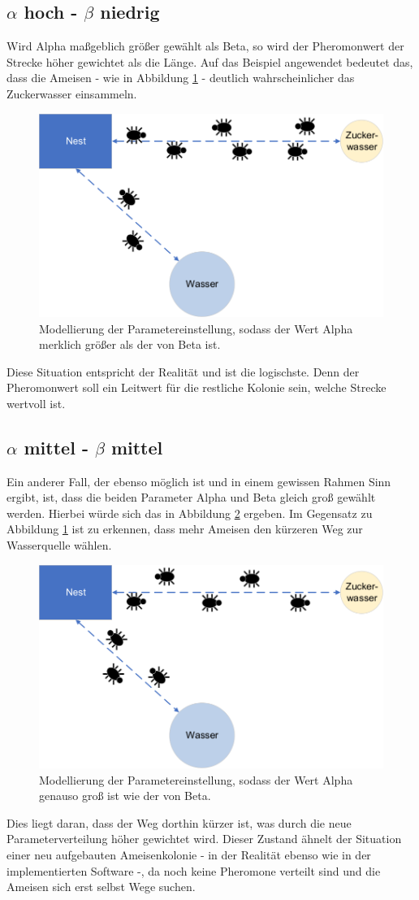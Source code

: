 {	\subsection{$\alpha$ hoch - $\beta$ niedrig}
	Wird Alpha maßgeblich größer gewählt als Beta, so wird der Pheromonwert der Strecke höher gewichtet als die Länge. Auf das Beispiel angewendet bedeutet das, dass die Ameisen - wie in Abbildung \ref{parameter_a>b} - deutlich wahrscheinlicher das Zuckerwasser einsammeln.
	\begin{figure}[H]
		\centering
		\includegraphics[width=0.4\linewidth]{images/AntAlgorithm_alphaMbeta.png}
		\caption{Modellierung der Parametereinstellung, sodass der Wert Alpha merklich größer als der von Beta ist.}
		\label{parameter_a>b}
	\end{figure}
	Diese Situation entspricht der Realität und ist die logischste. Denn der Pheromonwert soll ein Leitwert für die restliche Kolonie sein, welche Strecke wertvoll ist.
	
	\subsection{$\alpha$ mittel - $\beta$ mittel}
	Ein anderer Fall, der ebenso möglich ist und in einem gewissen Rahmen Sinn ergibt, ist, dass die beiden Parameter Alpha und Beta gleich groß gewählt werden. Hierbei würde sich das in Abbildung \ref{parameter_a=b} ergeben. Im Gegensatz zu Abbildung \ref{parameter_a>b} ist zu erkennen, dass mehr Ameisen den kürzeren Weg zur Wasserquelle wählen.
	\begin{figure}[H]
		\centering
		\includegraphics[width=0.4\linewidth]{images/AntAlgorithm_alphaEbeta.png}
		\caption{Modellierung der Parametereinstellung, sodass der Wert Alpha genauso groß ist wie der von Beta.}
		\label{parameter_a=b}
	\end{figure}
	Dies liegt daran, dass der Weg dorthin kürzer ist, was durch die neue Parameterverteilung höher gewichtet wird. Dieser Zustand ähnelt der Situation einer neu aufgebauten Ameisenkolonie - in der Realität ebenso wie in der implementierten Software -, da noch keine Pheromone verteilt sind und die Ameisen sich erst selbst Wege suchen.
	
}
